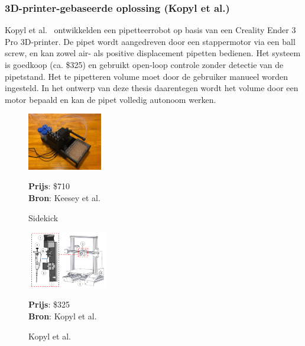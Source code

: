 \subsubsection{3D-printer-gebaseerde oplossing (Kopyl et al.)}
Kopyl et al.\ \cite{RN42} ontwikkelden een pipetteerrobot op basis van een Creality Ender 3 Pro 3D-printer. De pipet wordt aangedreven door een stappermotor via een ball screw, en kan zowel air- als positive displacement pipetten bedienen. Het systeem is goedkoop (ca. \$325) en gebruikt open-loop controle zonder detectie van de pipetstand. Het te pipetteren volume moet door de gebruiker manueel worden ingesteld. In het ontwerp van deze thesis daarentegen wordt het volume door een motor bepaald en kan de pipet volledig autonoom werken.
\\[12pt]\begin{minipage}[t]{0.49\textwidth}
    \vspace{0pt}
    \begin{figure}[H]
        \centering
        \captionsetup{width=0.85\textwidth}
        \includegraphics[height=2.5cm]{figures/Sidekick.png}
        \caption{Sidekick}\label{fig:Sidekick}
        \textbf{Prijs}: \$710\\
        \textbf{Bron}: Keesey et al.\ \cite{RN41}
    \end{figure}
\end{minipage}
\begin{minipage}[t]{0.49\textwidth}
    \vspace{0pt}
    \begin{figure}[H]
        \centering
        \captionsetup{width=1\textwidth}
        \includegraphics[height=2.5cm]{figures/kopyl-et-al.png}
        \caption{Kopyl et al.}\label{fig:kopyl}
        \textbf{Prijs}: \$325\\
        \textbf{Bron}: Kopyl et al.\ \cite{RN42}
    \end{figure}
\end{minipage}

